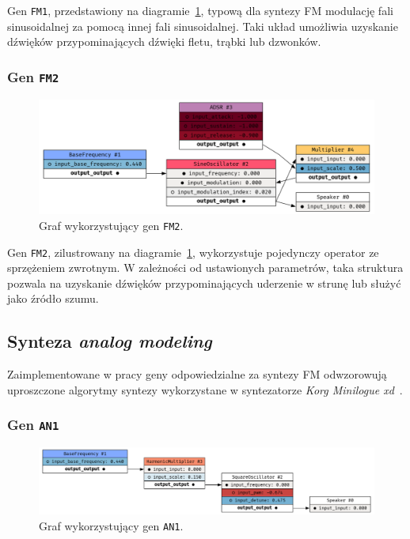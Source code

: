 Gen \texttt{FM1}, przedstawiony na diagramie~\ref{fig:gene_f2}, typową dla syntezy FM
modulację fali sinusoidalnej za pomocą innej fali sinusoidalnej. Taki układ umożliwia
uzyskanie dźwięków przypominających dźwięki fletu, trąbki lub dzwonków.

\subsubsection{Gen \texttt{FM2}}

\begin{figure}[H]
    \centering
    \includegraphics[width=1.0\linewidth]{rys06/gene_fm2.png}
    \caption{
      Graf wykorzystujący gen \texttt{FM2}.
    }\label{fig:gene_f2}
\end{figure}

Gen \texttt{FM2}, zilustrowany na diagramie~\ref{fig:gene_f2}, wykorzystuje pojedynczy
operator ze sprzężeniem zwrotnym. W zależności od ustawionych parametrów, taka struktura pozwala
na uzyskanie dźwięków przypominających uderzenie w strunę lub służyć jako źródło szumu.

\subsection{Synteza \textit{analog modeling}}

Zaimplementowane w pracy geny odpowiedzialne za syntezy FM odwzorowują uproszczone algorytmy syntezy wykorzystane
w syntezatorze \textit{Korg Minilogue xd}~\cite{yamaha_dx7_manual}.

\subsubsection{Gen \texttt{AN1}}

\begin{figure}[H]
    \centering
    \includegraphics[width=1.0\linewidth]{rys06/gene_an1.png}
    \caption{
      Graf wykorzystujący gen \texttt{AN1}.
    }\label{fig:gene_an1}
\end{figure}

